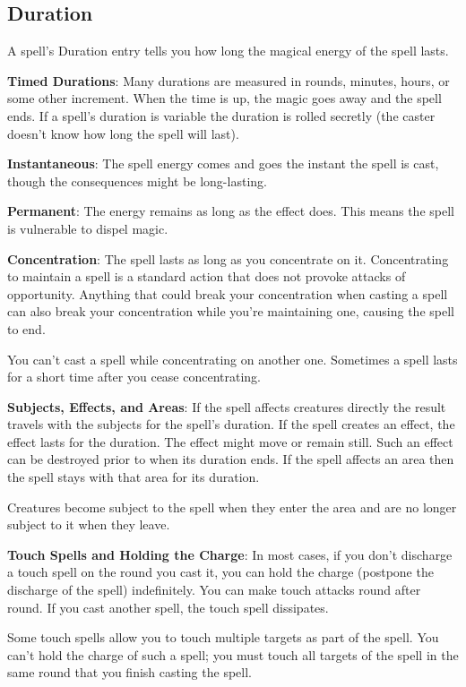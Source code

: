\subsection{Duration}
A spell's Duration entry tells you how long the magical energy of the spell lasts.

\textbf{Timed Durations}: Many durations are measured in rounds, minutes, hours, or some other increment. When the time is up, the magic goes away and the spell ends. If a spell's duration is variable the duration is rolled secretly (the caster doesn't know how long the spell will last).

\textbf{Instantaneous}: The spell energy comes and goes the instant the spell is cast, though the consequences might be long-lasting.

\textbf{Permanent}: The energy remains as long as the effect does. This means the spell is vulnerable to dispel magic.

\textbf{Concentration}: The spell lasts as long as you concentrate on it. Concentrating to maintain a spell is a standard action that does not provoke attacks of opportunity. Anything that could break your concentration when casting a spell can also break your concentration while you're maintaining one, causing the spell to end.

You can't cast a spell while concentrating on another one. Sometimes a spell lasts for a short time after you cease concentrating.

\textbf{Subjects, Effects, and Areas}: If the spell affects creatures directly the result travels with the subjects for the spell's duration. If the spell creates an effect, the effect lasts for the duration. The effect might move or remain still. Such an effect can be destroyed prior to when its duration ends. If the spell affects an area then the spell stays with that area for its duration.

Creatures become subject to the spell when they enter the area and are no longer subject to it when they leave.

\textbf{Touch Spells and Holding the Charge}: In most cases, if you don't discharge a touch spell on the round you cast it, you can hold the charge (postpone the discharge of the spell) indefinitely. You can make touch attacks round after round. If you cast another spell, the touch spell dissipates.

Some touch spells allow you to touch multiple targets as part of the spell. You can't hold the charge of such a spell; you must touch all targets of the spell in the same round that you finish casting the spell.

